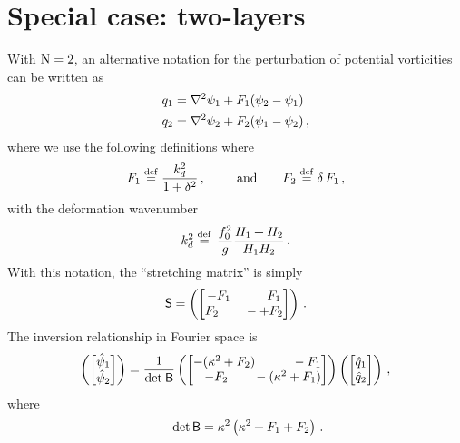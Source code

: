 \documentclass[11pt]{article}
\newcommand{\sS}{\mathsf{S}}
\begin{document}
\section*{Special case: two-layers}
With $\mathrm{N} = 2$, an alternative notation for the perturbation of potential vorticities can be written as
\begin{align}
    q_1 &= \nabla^2 \psi_1 + F_1 (\psi_2 - \psi_1) \nonumber\\
    q_2 &= \nabla^2 \psi_2 + F_2 (\psi_1  - \psi_2)\, ,
\end{align}
where we use the following definitions
where
\begin{equation}
F_1 \stackrel{\mathrm{def}}{=} \frac{k_d^2}{1 + \delta^2}\,, \qquad \:\:\text{and} \qquad F_2 \stackrel{\mathrm{def}}{=} \delta \,F_1\,,
\end{equation}
with the deformation wavenumber
\begin{equation}
k_d^2 \stackrel{\mathrm{def}}{=} \, \frac{f_0^2}{g} \frac{H_1+H_2}{H_1 H_2} \, .
\end{equation}
With this notation, the ``stretching matrix'' is simply
\begin{equation}
    \sS = \left(\begin{bmatrix}
- F_1 \qquad \:\:\:\:F_1\\
F_2 \qquad -  + F_2
\end{bmatrix}\right)\per
\end{equation}
The inversion relationship in Fourier space is
\begin{equation}
    \left(\begin{bmatrix}
\hat{\psi}_1\\
\hat{\psi}_2\\
\end{bmatrix}\right)
= \frac{1}{\text{det} \: \mathsf{B}}
\left(\begin{bmatrix}
-(\kappa^2 + F_2) \qquad \:\:\:\:-F_1\\
\:\:\:\: -F_2 \qquad - (\kappa^2 + F_1)
\end{bmatrix}\right)
\left(\begin{bmatrix}
\hat{q}_1\\
\hat{q}_2\\
\end{bmatrix}\right)\, ,
\end{equation}
where 
\begin{equation}
\qquad \text{det}\, \mathsf{B} = \kappa^2\left(\kappa^2 + F_1 + F_2\right)\,.
\end{equation}
\end{document}
